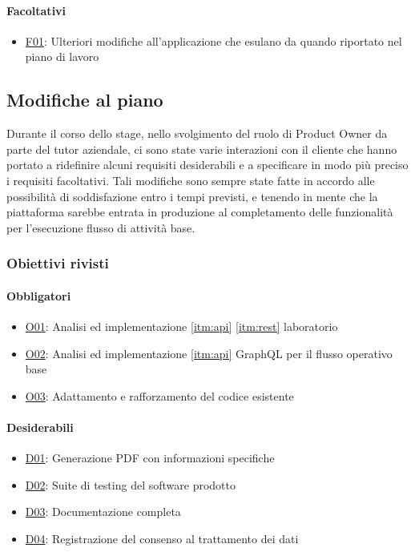 \paragraph{Facoltativi}
\begin{itemize}
    \item \underline{F01}: Ulteriori modifiche all’applicazione che esulano da quando riportato nel piano di lavoro
\end{itemize}
\vspace{-12pt}
\subsection{Modifiche al piano}
Durante il corso dello stage, nello svolgimento del ruolo di Product Owner da parte del tutor aziendale, ci sono state varie interazioni con il cliente che hanno portato a ridefinire alcuni requisiti desiderabili e a specificare in modo più preciso i requisiti facoltativi. Tali modifiche sono sempre state fatte in accordo alle possibilità di soddisfazione entro i tempi previsti, e tenendo in mente che la piattaforma sarebbe entrata in produzione al completamento delle funzionalità per l'esecuzione flusso di attività base.
\subsubsection{Obiettivi rivisti}
\label{sec:reqs}
\paragraph{Obbligatori}
\begin{itemize}
    \item \underline{O01}: Analisi ed implementazione \ref{itm:api} \ref{itm:rest} laboratorio
    \item \underline{O02}: Analisi ed implementazione \ref{itm:api} GraphQL per il flusso operativo base
    \item \underline{O03}: Adattamento e rafforzamento del codice esistente
\end{itemize}
\vspace{-15pt}
\paragraph{Desiderabili}
\begin{itemize}
    \item \underline{D01}: Generazione PDF con informazioni specifiche
    \item \underline{D02}: Suite di testing del software prodotto
    \item \underline{D03}: Documentazione completa
    \item \underline{D04}: Registrazione del consenso al trattamento dei dati
\end{itemize}
\vspace{-15pt}
